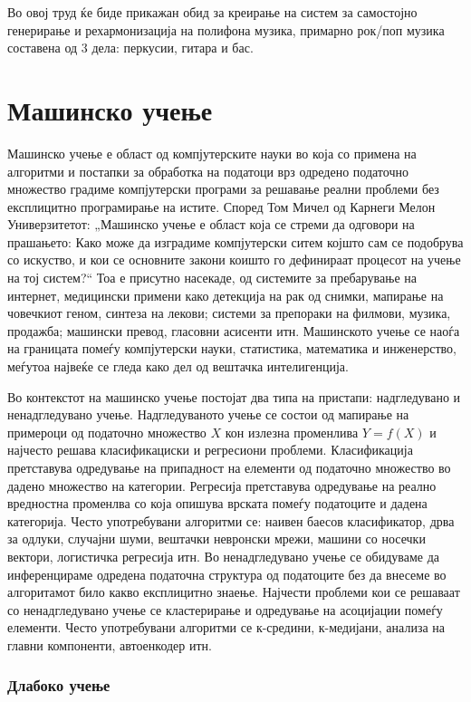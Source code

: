 Во овој труд ќе биде прикажан обид за креирање на систем за самостојно генерирање и рехармонизација на полифона музика, примарно рок/поп музика составена од 3 дела: перкусии, гитара и бас.

\chapter{Машинско учење}
\label{ch:masinsko}

Машинско учење е област од компјутерските науки во која со примена на алгоритми и постапки за обработка на податоци врз одредено податочно множество градиме компјутерски програми за решавање реални проблеми без експлицитно програмирање на истите. Според Том Мичел од Карнеги Мелон Универзитетот: „Машинско учење е област која се стреми да одговори на прашањето: Како може да изградиме компјутерски ситем којшто сам се подобрува со искуство, и кои се основните закони коишто го дефинираат процесот на учење на тој систем?“ Тоа е присутно насекаде, од системите за пребарување на интернет, медицински примени како детекција на рак од снимки, мапирање на човечкиот геном, синтеза на лекови; системи за препораки на филмови, музика, продажба; машински превод, гласовни асисенти итн. Машинското учење се наоѓа на границата помеѓу компјутерски науки, статистика, математика и инженерство, меѓутоа највеќе се гледа како дел од вештачка интелигенција.

Во контекстот на машинско учење постојат два типа на пристапи: надгледувано и ненадгледувано учење. Надгледуваното учење се состои од мапирање на примероци од податочно множество $X$ кон излезна променлива $Y=f(X)$ и најчесто решава класификациски и регресиони проблеми. Класификација претставува одредување на припадност на елементи од податочно множество во дадено множество на категории. Регресија претставува одредување на реално вредностна променлва со која опишува врската помеѓу податоците и дадена категорија. Често употребувани алгоритми се: наивен баесов класификатор, дрва за одлуки, случајни шуми, вештачки невронски мрежи, машини со носечки вектори, логистичка регресија итн. 
Во ненадгледувано учење се обидуваме да инференцираме одредена податочна структура од податоците без да внесеме во алгоритамот било какво експлицитно знаење. Најчести проблеми кои се решаваат со ненадгледувано учење се кластерирање и одредување на асоцијации помеѓу елементи. Често употребувани алгоритми се к-средини, к-медијани, анализа на главни компоненти, автоенкодер итн.

\subsection{Длабоко учење}

